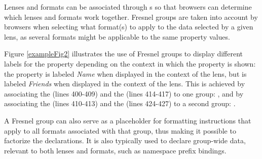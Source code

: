 Lenses and formats can be associated through s so that browsers can determine which lenses and formats work together.  Fresnel groups are taken into account by browsers when selecting what format(s) to apply to the data selected by a given lens, as several formats might be applicable to the same property values.

Figure \ref{exampleFig2} illustrates the use of Fresnel groups to display different labels for the  property depending on the context in which the property is shown: the property is labeled {\em Name} when displayed in the context of the  lens, but is labeled {\em Friends} when displayed in the context of the  lens. This is achieved by associating the  (lines 400-409) and the  (lines 414-417) to one group: , and by associating the  (lines 410-413) and the  (lines 424-427) to a second group: .

A Fresnel group can also serve as a placeholder for formatting instructions that apply to all formats associated with that group, thus making it possible to factorize the declarations. It is also typically used to declare group-wide data, relevant to both lenses and formats, such as namespace prefix bindings.
